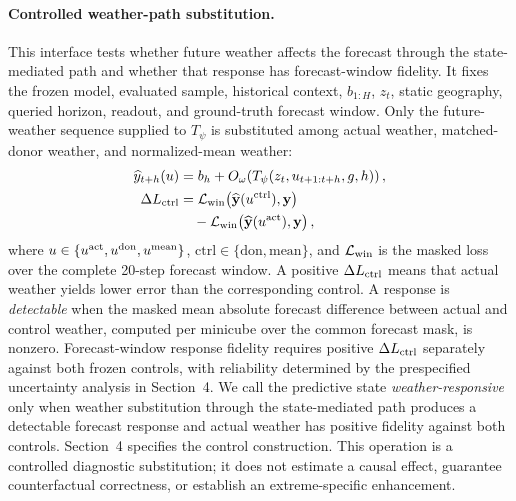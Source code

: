 \documentclass[letterpaper]{article} %
\begin{document}
\paragraph{Controlled weather-path substitution.}
This interface tests whether future weather affects the forecast through the
state-mediated path and whether that response has forecast-window fidelity.
It fixes the frozen model, evaluated sample, historical context, $b_{1:H}$,
$z_t$, static geography, queried horizon, readout, and ground-truth forecast
window. Only the future-weather sequence supplied to $T_\psi$ is substituted
among actual weather, matched-donor weather, and normalized-mean weather:
\begin{equation}
\begin{aligned}
\widehat y_{t+h}(u)
&=b_h+O_\omega\!\left(
T_\psi(z_t,u_{t+1:t+h},g,h)\right),\\
\Delta L_{\rm ctrl}
&=\mathcal L_{\rm win}
\!\left(\widehat{\mathbf y}(u^{\rm ctrl}),\mathbf y\right)\\
&\quad-\mathcal L_{\rm win}
\!\left(\widehat{\mathbf y}(u^{\rm act}),\mathbf y\right),
\end{aligned}
\label{eq:interfaces}
\end{equation}
where $u\in\{u^{\rm act},u^{\rm don},u^{\rm mean}\}$,
$\mathrm{ctrl}\in\{\mathrm{don},\mathrm{mean}\}$, and
$\mathcal L_{\rm win}$ is the masked loss over the complete 20-step forecast
window. A positive $\Delta L_{\rm ctrl}$ means that actual weather yields
lower error than the corresponding control. A response is
\emph{detectable} when the masked mean absolute forecast
difference between actual and control weather, computed per minicube over
the common forecast mask, is nonzero. Forecast-window response fidelity requires positive
$\Delta L_{\rm ctrl}$ separately against both frozen controls, with
reliability determined by the prespecified uncertainty analysis in Section~4.
We call the predictive state \emph{weather-responsive} only when weather
substitution through the state-mediated path produces a detectable forecast
response and actual weather has positive fidelity against both controls.
Section~4 specifies the control construction. This operation is a controlled
diagnostic substitution; it does not estimate a causal effect, guarantee
counterfactual correctness, or establish an extreme-specific enhancement.
\end{document}
